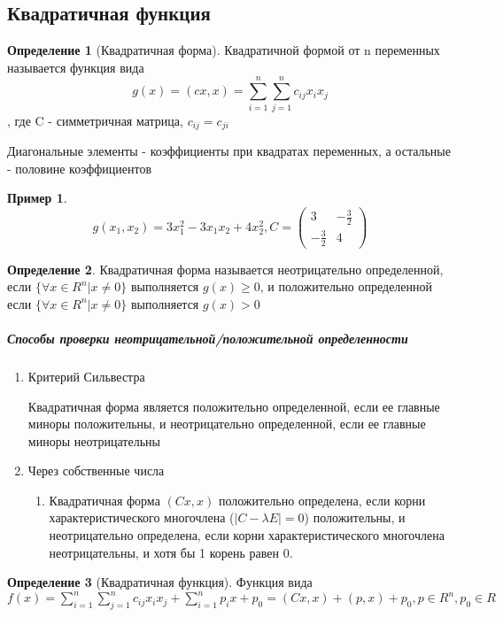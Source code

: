 \documentclass[a4paper]{article}
\theoremstyle{definition}
\newtheorem*{example}{Пример}
\newtheorem*{definition}{Определение}
\theoremstyle{remark}
\begin{document}
\subsection{Квадратичная функция}
\begin{definition}[Квадратичная форма]
    Квадратичной формой от n переменных называется функция вида
    \[g(x)  = (cx, x) = \sum_{i=1}^{n}\sum_{j=1}^{n}c_{ij}x_i x_j\], где C - симметричная матрица, $c_{ij} = c_{ji}$

    Диагональные элементы - коэффициенты при квадратах переменных, а остальные - половине коэффициентов
\end{definition}
\begin{example}
    \[g(x_1, x_2) = 3x_1^2 -3x_1x_2 + 4x_2^2, C =\begin{pmatrix}
        3 & -\frac32\\
        -\frac32 & 4
        \end{pmatrix}\]
    
\end{example}
\begin{definition}
    Квадратичная форма называется неотрицательно определенной, если $\{\forall x\in R^n  | x\neq 0\}$ выполняется $g(x)\ge 0$, и положительно определенной если $\{\forall x\in R^n  | x\neq 0\}$ выполняется $g(x) > 0$
\end{definition}
\subparagraph*{Способы проверки неотрицательной/положительной определенности}
\begin{enumerate}
    \item Критерий Сильвестра

    Квадратичная форма является положительно определенной, если ее главные миноры положительны, и неотрицательно определенной, если ее главные миноры неотрицательны
    \item Через собственные числа

    \begin{enumerate}
        \item Квадратичная форма $(Cx, x)$ положительно определена, если корни характеристического многочлена ($|C-\lambda E| = 0$) положительны, и неотрицательно определена, если корни характеристического многочлена неотрицательны, и хотя бы 1 корень равен 0.
    \end{enumerate}
\end{enumerate}
\begin{definition}[Квадратичная функция]
    Функция вида $f(x) = \sum_{i = 1}^n \sum _{j = 1}^nc_{ij}x_i x_j +\sum_{i = 1}^n p_i x + p_0 = (Cx, x) + (p, x) + p_0, p \in R^n, p_0\in R$ 
\end{definition}
\end{document}

